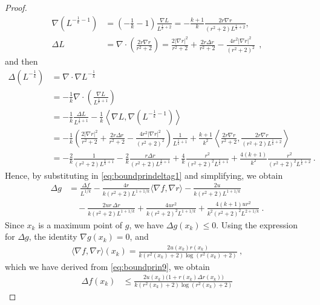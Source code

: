 \documentclass[a4paper,11pt,openright,twoside]{book}
\newcommand{\1}{\mathds{1}}
\theoremstyle{plain}
\theoremstyle{definition}
\theoremstyle{remark}
\begin{document}
\begin{proof}
\begin{align*}
		\nabla \left( L^{-\frac{1}{k}-1} \right) &= \left( -\frac{1}{k}-1 \right)\frac{\nabla L}{L^{\frac{1}{k}+2}}
		= -\frac{k+1}{k}\frac{2r\nabla r}{(r^2+2)L^{\frac{1}{k}+2}},\\
		\Delta L &= \nabla \cdot \left( \frac{2r \nabla r}{r^2+2} \right)
		= \frac{2|\nabla r|^2}{r^2+2}+ \frac{2 r \Delta r}{r^2+2}- \frac{4 r^2 |\nabla r|^2}{(r^2+2)^2}
		\ \ ,
	\end{align*}
	and then
	\begin{align*}
		\Delta \left( L^{-\frac{1}{k}} \right) &= \nabla \cdot \nabla L^{-\frac{1}{k}} \\
											   &= -\frac{1}{k}\nabla \cdot \left( \frac{\nabla L}{L^{\frac{1}{k}+1}} \right) \\
		&= -\frac{1}{k} \frac{\Delta L}{L^{\frac{1}{k}+1}}-\frac{1}{k} \left<\nabla L, \nabla \left( L^{-\frac{1}{k}-1} \right)  \right>\\
		&= -\frac{1}{k} \left( \frac{2|\nabla r|^2}{r^2+2} +
		\frac{2r \Delta r}{r^2+2} -
		\frac{4r^2 |\nabla r|^2}{(r^2+2)^2}\right)
		\frac{1}{L^{\frac{1}{k}+1}}
		+
		\frac{k+1}{k^2}\left<\frac{2r \nabla r}{r^2+2}, \frac{2r\nabla r}{(r^2+2)L^{\frac{1}{k}+2}} \right>\\
		&= -\frac{2}{k} \frac{1}{(r^2+2)L^{\frac{1}{k}+1}}
		- \frac{2}{k} \frac{r\Delta r}{(r^2+2) L^{\frac{1}{k}+1}}
		+ \frac{4}{k} \frac{r^2}{(r^2+2)^2 L^{\frac{1}{k}+1}}
		+ \frac{4(k+1)}{k^2} \frac{r^2}{(r^2+2)^2L^{\frac{1}{k}+2}}
		\ .
	\end{align*}
Hence, by substituting in  \eqref{eq:boundprindeltag1} and simplifying, we obtain
	\begin{align*}
		\Delta g &= \frac{\Delta f}{L^{1/k}}
		-\frac{4r}{k(r^2+2)L^{1+1/k}} \langle \nabla f, \nabla r \rangle
		-\frac{2u}{k(r^2+2)L^{1+1/k}} \\
		&\quad
		-\frac{2ur \, \Delta r}{k(r^2+2)L^{1+1/k}}
		+\frac{4ur^2}{k(r^2+2)^2L^{1+1/k}}
		+\frac{4(k+1)ur^2}{k^2(r^2+2)^2L^{2+1/k}}\ .
	\end{align*}
	Since $x_k$	is a maximum point of $g$, we have $\Delta g(x_k)\leq 0$. Using the expression for $\Delta g$, the identity $\nabla g(x_k)=0$, and
	\begin{align*}
		\langle \nabla f,\nabla r\rangle(x_k)
		=
		\frac{2u(x_k)r(x_k)}{k(r^2(x_k)+2)\log(r^2(x_k)+2)}
		\ ,
	\end{align*}
	which we have derived from \eqref{eq:boundprin9}, we obtain
	\begin{align*}
		\Delta f(x_k)
		&\le
		\frac{2u(x_k)\bigl(1+r(x_k)\Delta r(x_k)\bigr)}{k(r^2(x_k)+2)\log(r^2(x_k)+2)}

\end{align*}
\end{proof}
\end{document}
